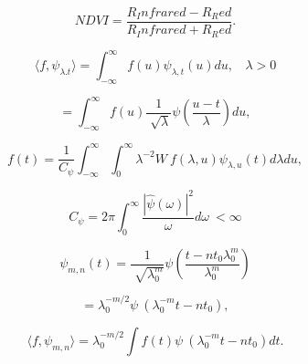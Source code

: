 \documentclass{article}
\begin{document}
$$NDVI=\frac{R_Infrared-R_Red}{R_Infrared+R_Red}.$$


$$\langle{f},\psi_{\lambda.t}\rangle=\int_{-\infty}^{\infty}f(u)\psi_{\lambda,t}(u)du, \  \ \ \ \lambda>0$$


$$=\int_{-\infty}^{\infty}f(u)\frac{1}{\sqrt[]{\lambda}}\psi\left(\frac{u-t}{\lambda}\right)du, $$


$$f(t)=\frac{1}{C_\psi}\int_{-\infty}^{\infty}\int_{0}^{\infty}\lambda^{-2} W \ f(\lambda,u)\psi_{\lambda,u} (t)d\lambda du,$$


$${C_\psi}=2\pi\int_{0}^{\infty}\frac{|\hat{\psi}(\omega)|^2}{\omega}d\omega \ <\infty$$ 


$$\psi_{m,n}(t)=\frac{1}{\sqrt[]{\lambda^m_0}}\psi\left(\frac{t-nt_0\lambda^m_0}{\lambda^m_0}\right)$$


$$=\lambda^{-m/2}_0 \psi\ (\lambda^{-m}_0t-nt_0),$$


$$\langle{f},\psi_{m,n}\rangle=\lambda^{-m/2}_0 \int {f(t)}\psi \ (\lambda^{-m}_0t-nt_0)dt.$$
\end{document}
